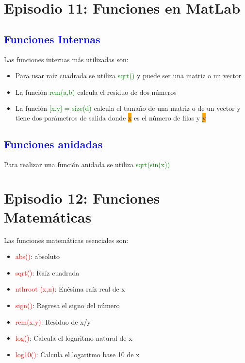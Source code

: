 \documentclass{article}
\begin{document}
	
	\section{Episodio 11: Funciones en MatLab}




	\subsection{\textcolor{blue}{Funciones Internas}}
	
	Las funciones internas más utilizadas son:
	
	\begin{itemize}
		\item Para usar raíz cuadrada se utiliza \textcolor{green}{sqrt()} y puede ser una matriz o un vector
		\item La función \textcolor{green}{rem(a,b)} calcula el residuo de dos números
		\item La función \textcolor{green}{[x,y] = size(d)} calcula el tamaño de una matriz o de un vector y tiene dos parámetros de salida donde \colorbox{orange}{x} es el número de filas y \colorbox{orange}{y}
		
	\end{itemize}
	
	\subsection{\textcolor{blue}{Funciones anidadas}}

	Para realizar una función anidada se utiliza \textcolor{green}{sqrt(sin(x))}

	\section{Episodio 12: Funciones Matemáticas}
	
	Las funciones matemáticas esenciales son:
	
	\begin{itemize}
		\item \textcolor{red}{abs()}: absoluto
		\item \textcolor{red}{sqrt()}: Raíz cuadrada
		\item \textcolor{red}{nthroot (x,n)}: Enésima raíz real de x
		\item \textcolor{red}{sign()}: Regresa el signo del número
		\item \textcolor{red}{rem(x,y)}: Residuo de x/y
		\item \textcolor{red}{log()}: Calcula el logaritmo natural de x
		\item \textcolor{red}{log10()}: Calcula el logaritmo base 10 de x
	\end{itemize}
\end{document}
